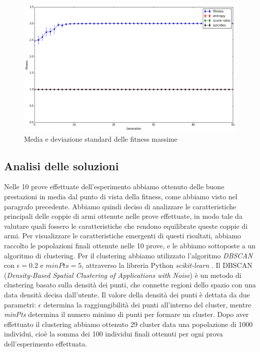 \documentclass[12pt, italian]{toptesi}
\begin{document}
\begin{figure}[tp]
\centering
\includegraphics[width=1.0\textwidth]{avg_of_max}
\caption{Media e deviazione standard delle fitness massime}
\label{fig:avg_of_max}
\end{figure}

\subsection{Analisi delle soluzioni}

Nelle 10 prove effettuate dell'esperimento abbiamo ottenuto delle buone prestazioni in media dal punto di vista della fitness, come abbiamo visto nel paragrafo precedente.
Abbiamo quindi deciso di analizzare le caratteristiche principali delle coppie di armi ottenute nelle prove effettuate, in modo tale da valutare quali fossero le caratteristiche che rendono equilibrate queste coppie di armi.
Per visualizzare le caratteristiche emergenti di questi risultati, abbiamo raccolto le popolazioni finali ottenute nelle 10 prove, e le abbiamo sottoposte a un algoritmo di clustering.
Per il clustering abbiamo utilizzato l'algoritmo \emph{DBSCAN} \cite{dbscan:article} con $\epsilon = 0.2$ e $minPts = 5$, attraverso la libreria {P}ython \emph{scikit-learn} \cite{scikit-learn:article}.
Il DBSCAN (\emph{Density-Based Spatial Clustering of Applications with Noise}) è un metodo di clustering basato sulla densità dei punti, che connette regioni dello spazio con una data densità decisa dall'utente.
Il valore della densità dei punti è dettata da due parametri: $\epsilon$ determina la raggiungibilità dei punti all'interno del cluster, mentre \emph{minPts} determina il numero minimo di punti per formare un cluster.
Dopo aver effettuato il clustering abbiamo ottenuto 29 cluster data una popolazione di 1000 individui, cioè la somma dei 100 individui finali ottenuti per ogni prova dell'esperimento effettuata.
\end{document}
